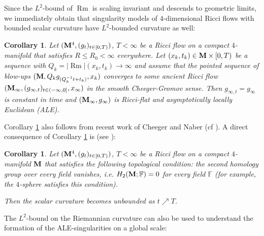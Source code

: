 \documentclass[11pt]{amsart}
\numberwithin{equation}{section}
\newtheorem{corollary}[theorem]{Corollary}
\def\M{{\bf M}}
\DeclareMathOperator{\Rm}{Rm}
\numberwithin{equation}{section}
\begin{document}
Since the $L^2$-bound of $\Rm$ is scaling invariant and descends to geometric limits, we immediately obtain that singularity models of $4$-dimensional Ricci flows with bounded scalar curvature have $L^2$-bounded curvature as well:

\begin{corollary} \label{Cor:blowupALE}
Let $(\M^4, (g_t)_{t \in [0,T)})$, $T < \infty$ be a Ricci flow on a compact $4$-manifold that satisfies $R  \leq R_0 < \infty$ everywhere.
Let $(x_k, t_k) \in \M \times [0,T)$ be a sequence with $Q_k = |{\Rm}| (x_k, t_k) \to \infty$ and assume that the pointed sequence of blow-ups $(\M, Q_k g_{(Q_k^{-1} t + t_k)}, x_k)$ converges to some ancient Ricci flow $(\M_\infty, (g_{\infty,t})_{t \in (-\infty, 0]}, x_\infty)$ in the smooth Cheeger-Gromov sense.
Then $g_{\infty, t} = g_\infty$ is constant in time and $(\M_\infty, g_\infty )$ is Ricci-flat and asymptotically locally Euclidean (ALE).
\end{corollary}

Corollary \ref{Cor:blowupALE} also follows from recent work of Cheeger and Naber (cf \cite{Cheeger-Naber-codim-4}).
A direct consequence of Corollary \ref{Cor:blowupALE} is (see \cite[Corollary 5.8]{Anderson}):

\begin{corollary}
Let $(\M^4, (g_t)_{t \in [0,T)})$, $T < \infty$ be a Ricci flow on a compact $4$-manifold $\M$ that satisfies the following topological condition: the second homo\-logy group over every field vanishes, i.e. $H_2 (\M; \mathbb{F}) = 0$ for every field $\mathbb{F}$ (for example, the $4$-sphere satisfies this condition).

Then the scalar curvature becomes unbounded as $t \nearrow T$.
\end{corollary}

The $L^2$-bound on the Riemannian curvature can also be used to understand the formation of the ALE-singularities on a global scale:
\end{document}
